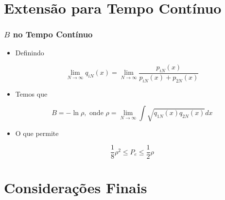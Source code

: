 \documentclass{beamer}
\begin{document}
\section{Extensão para Tempo Contínuo}

\begin{comment}

\begin{frame}
    \frametitle{Caso de M hipóteses}
    Para o caso de M hipóteses, a distância média de Bhattacharyya

\begin{equation*}
	\overline{B} = \sum_{i,j}^{M} \pi^{(i)}\pi^{(j)} \int_{-\infty}^{\infty} \sqrt{p_1(x)p_2(x)} dx
\end{equation*}

\end{frame}

\end{comment}

\begin{frame}

	\frametitle{$B$ no Tempo Contínuo}

	\begin{itemize}
	
		\item[] Definindo
		
		$$ \lim_{N \rightarrow \infty} q_{iN}(x) = \lim_{N \rightarrow \infty} \frac{p_{iN}(x)}{p_{iN}(x) + p_{2N}(x)} $$

		\item[] Temos que
		
		$$ B = - \ln \rho, \text{ onde } \rho = \lim_{N \rightarrow \infty} \int \sqrt{q_{1N}(x)q_{2N}(x)}dx $$
		
		\item[] O que permite

		$$ \frac{1}{8} \rho^2 \leq P_e \leq \frac{1}{2} \rho $$
	\end{itemize}

\end{frame}

\section{Considerações Finais}
\end{document}
